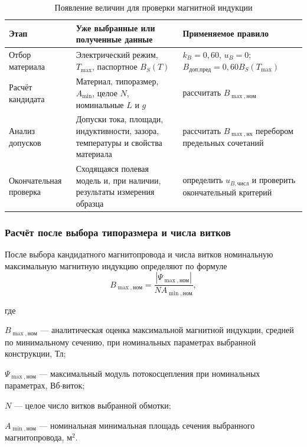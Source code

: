 \documentclass[14pt,a4paper]{extarticle}
\newenvironment{whereblock}
 {\par\noindent где\par
  \begin{list}{}{\setlength{\leftmargin}{12.5mm}
                  \setlength{\itemindent}{-12.5mm}
                  \setlength{\itemsep}{0pt}
                  \setlength{\parsep}{0pt}
                  \setlength{\topsep}{0pt}}}
 {\end{list}}
\newcommand{\whereitem}[2]{\item[] #1 --- #2}
\begin{document}
\begin{table}[H]
\caption{Появление величин для проверки магнитной индукции}
\label{tab:b-uncertainty-stages}
\centering
\small
\begin{tabularx}{\textwidth}{
>{\raggedright\arraybackslash}p{30mm}
>{\raggedright\arraybackslash}p{52mm}
>{\raggedright\arraybackslash}X}
\toprule
Этап & Уже выбранные или полученные данные & Применяемое правило \\
\midrule
Отбор материала &
Электрический режим, $T_{\max}$, паспортное $B_S(T)$ &
$k_B=0{,}60$, $u_B=0$;
$B_{\text{доп,пред}}=0{,}60B_S(T_{\max})$ \\
Расчёт кандидата &
Материал, типоразмер, $A_{\min}$, целое $N$, номинальные $L$ и $g$ &
рассчитать $B_{\max,\text{ном}}$ \\
Анализ допусков &
Допуски тока, площади, индуктивности, зазора, температуры и свойства
материала &
рассчитать $B_{\max,\text{нх}}$ перебором предельных сочетаний \\
Окончательная проверка &
Сходящаяся полевая модель и, при наличии, результаты измерения образца &
определить $u_{B,\text{числ}}$ и проверить окончательный критерий \\
\bottomrule
\end{tabularx}
\end{table}

\subsubsection{Расчёт после выбора типоразмера и числа витков}

После выбора кандидатного магнитопровода и числа витков номинальную
максимальную магнитную индукцию определяют по формуле
\begin{equation}
 B_{\max,\text{ном}}=
 \frac{
 \left|\Psi_{\max,\text{ном}}\right|
 }{
 N A_{\min,\text{ном}}
 },
 \label{eq:bmax-nominal}
\end{equation}
\begin{whereblock}
\whereitem{$B_{\max,\text{ном}}$}{аналитическая оценка максимальной
магнитной индукции, средней по минимальному сечению, при номинальных
параметрах выбранной конструкции, Тл;}
\whereitem{$\Psi_{\max,\text{ном}}$}{максимальный модуль потокосцепления
при номинальных параметрах, Вб$\cdot$виток;}
\whereitem{$N$}{целое число витков выбранной обмотки;}
\whereitem{$A_{\min,\text{ном}}$}{номинальная минимальная площадь
сечения выбранного магнитопровода, м$^2$.}
\end{whereblock}
\end{document}
